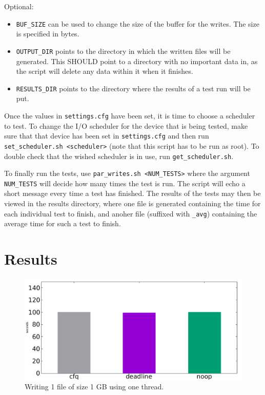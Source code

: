\documentclass[10pt, titlepage, oneside, a4paper]{article}
\begin{document}
        Optional:
        
        \begin{itemize}
            \item \texttt{BUF\_SIZE} can be used to change the size of the buffer for the writes. The size is specified in bytes.
            \item \texttt{OUTPUT\_DIR} points to the directory in which the written files will be generated. This SHOULD point to a directory with no important data in, as the script will delete any data within it when it finishes.
            \item \texttt{RESULTS\_DIR} points to the directory where the results of a test run will be put.
        \end{itemize}
        
        Once the values in \texttt{settings.cfg} have been set, it is time to choose a scheduler to test. To change the I/O scheduler for the device that is being tested, make sure that that device has been set in \texttt{settings.cfg} and then run \texttt{set\_scheduler.sh <scheduler>} (note that this script has to be run as root). To double check that the wished scheduler is in use, run \texttt{get\_scheduler.sh}.
        
        To finally run the tests, use \texttt{par\_writes.sh <NUM\_TESTS>} where the argument \texttt{NUM\_TESTS} will decide how many times the test is run. The script will echo a short message every time a test has finished. The results of the tests may then be viewed in the results directory, where one file is generated containing the time for each individual test to finish, and anoher file (suffixed with \texttt{\_avg}) containing the average time for such a test to finish.
        
        \section{Results} \label{results}
        
        \begin{figure}
            \centering
            \includegraphics[width=1.0\textwidth]{1f_1gb_1t.pdf}
            \caption{Writing 1 file of size 1 GB using one thread.}
            \label{fig:1f_1gb_1t}
        \end{figure}
        
\end{document}
